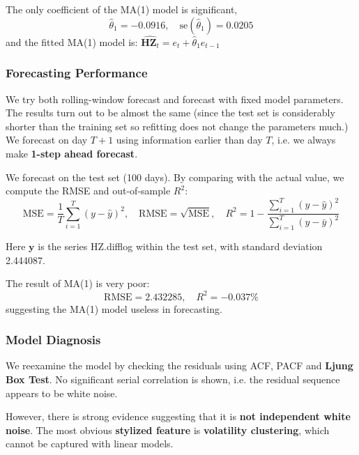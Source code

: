 \documentclass[aps,pre,12pt,preprint,onecolumn,showpacs,showkeys]{revtex4-1}
\def \HZ {\bm{HZ}}
\begin{document}
        The only coefficient of the MA(1) model is significant, 
        \begin{equation}
            \hat \theta _1 = -0.0916,\quad \mathrm{se}(\hat \theta_1)= 0.0205
        \end{equation}
        and the fitted MA(1) model is: $\hat {\HZ_t} = e_t + \hat \theta _1 e_{t-1}$

        \subsubsection{Forecasting Performance}
        We try both rolling-window forecast and forecast with fixed model parameters. The results turn out to be almost the same (since the test set is considerably shorter than the training set so refitting does not change the parameters much.) We forecast on day $T+1$ using information earlier than day $T$, i.e. we always make \textbf{1-step ahead forecast}.

        We forecast on the test set (100 days). By comparing with the actual value, we compute the RMSE and out-of-sample $R^2$:
        \begin{equation}
            \mathrm{MSE}= \frac{1}{T}\sum _{i=1}^T (y-\hat y)^2, \quad \mathrm{RMSE}= \sqrt{\mathrm{MSE}}, \quad R^2= 1- \frac{\sum _{i=1}^T (y- \hat y)^2}{\sum _{i=1}^T (y- \bar y)^2}
        \end{equation}
        
        Here $\bm y$ is the series HZ.difflog within the test set, with standard deviation 2.444087.
        
        The result of MA(1) is very poor:
        \begin{equation}
            \mathrm{RMSE}=2.432285,\quad R^2=-0.037\%
        \end{equation}
        suggesting the MA(1) model useless in forecasting.

        \subsubsection{Model Diagnosis}
            We reexamine the model by checking the residuals using ACF, PACF and \textbf{Ljung Box Test}. No significant serial correlation is shown, i.e. the residual sequence appears to be white noise.

            However, there is strong evidence suggesting that it is \textbf{not independent white noise}. The most obvious \textbf{stylized feature} is \textbf{volatility clustering}, which cannot be captured with linear models.
\end{document}
